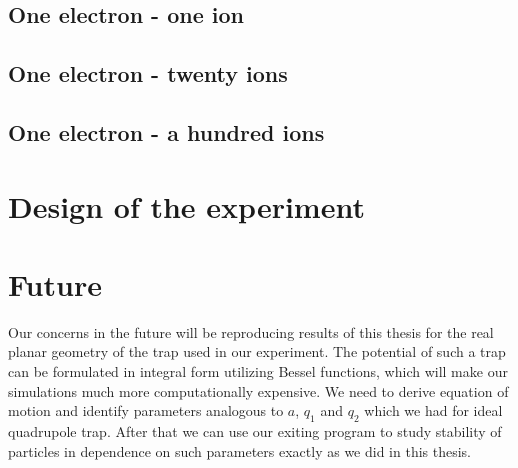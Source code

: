 \subsection{One electron - one ion}
\subsection{One electron - twenty ions}
\subsection{One electron - a hundred ions}

\section{Design of the experiment}

\section{Future}
\label{chap:future}

Our concerns in the future will be reproducing results of this thesis for the real planar geometry of the trap used in our experiment. The potential of such a trap can be formulated in integral form utilizing Bessel functions, which will make our simulations much more computationally expensive. We need to derive equation of motion and identify parameters analogous to $a$, $q_1$ and $q_2$ which we had for ideal quadrupole trap. After that we can use our exiting program to study stability of particles in dependence on such parameters exactly as we did in this thesis. 